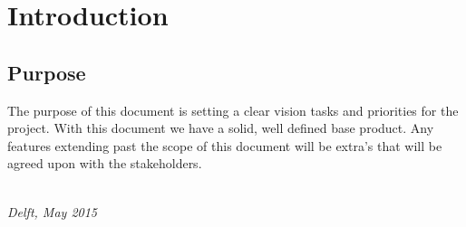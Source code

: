\chapter{Introduction}

\section{Purpose}
The purpose of this document is setting a clear vision tasks and priorities for the project. With this document we have a solid, well defined base product. Any features extending past the scope of this document will be extra's that will be agreed upon with the stakeholders.
\begin{flushright}
{\makeatletter\itshape
    \@author \\
    Delft, May 2015
\makeatother}
\end{flushright}

